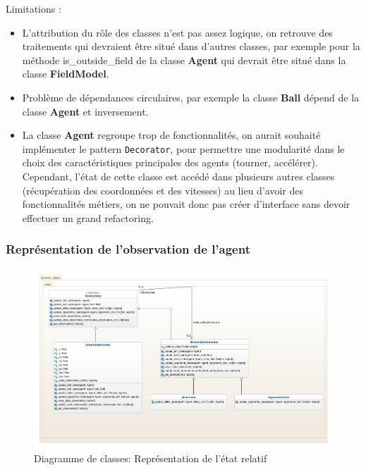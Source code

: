 \documentclass[11pt, a4paper]{article}
\begin{document}
	\noindent Limitations : \\
	\begin{itemize}
		\item L'attribution du rôle des classes n'est pas assez logique, on retrouve des traitements qui devraient être situé dans d'autres classes, par exemple pour la méthode is\_outside\_field de la classe \textbf{Agent} qui devrait être situé dans la classe \textbf{FieldModel}.
		\item Problème de dépendances circulaires, par exemple la classe \textbf{Ball} dépend de la classe \textbf{Agent} et inversement.
		\item La classe \textbf{Agent} regroupe trop de fonctionnalités, on aurait souhaité implémenter le pattern \texttt{Decorator}, pour permettre une modularité dans le choix des caractéristiques principales des agents (tourner, accélérer). Cependant, l'état de cette classe est
		accédé dans plusieurs autres classes (récupération des coordonnées et des vitesses) au lieu d'avoir des fonctionnalités métiers, on ne pouvait donc pas créer d'interface sans devoir effectuer un grand refactoring.
	\end{itemize}

	\subsubsection{Représentation de l'observation de l'agent}

	\begin{figure}[H]
		\centering
		\includegraphics[scale=0.46]{images/robocup-state.png}
		\caption {Diagramme de classes: Représentation de l'état relatif}
	\end{figure}
\end{document}
